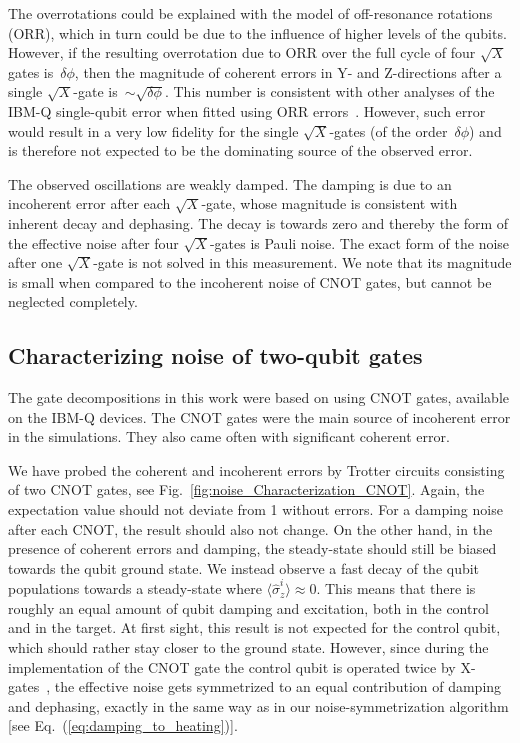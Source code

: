 \documentclass[twocolumn,amsmath,amssymb,pra]{revtex4-2}
\begin{document}
The overrotations could be explained with the model of off-resonance rotations~\cite{McKay_2017} (ORR),
which in turn could be due to the influence of higher levels of the qubits.
However, if the resulting overrotation due to ORR over the full cycle of four $\sqrt{X}$ gates is~$\delta\phi$,
then the magnitude of coherent errors in Y- and Z-directions after a single $\sqrt{X}$-gate is~$\sim \sqrt{\delta\phi}$.
This number is consistent with other analyses of the IBM-Q single-qubit error when fitted using ORR errors~\cite{Bultrini2021}.
However, such error would result in a very low fidelity for the single $\sqrt{X}$-gates (of the order~$\delta\phi$)
and is therefore not expected to be the dominating source of the observed error.

The observed oscillations are weakly damped.
The damping is due to an incoherent error after each $\sqrt{X}$-gate, whose magnitude is consistent with inherent decay and dephasing.
The decay is towards zero and thereby the form of the effective noise after four $\sqrt{X}$-gates
is Pauli noise.
The exact form of the noise after one $\sqrt{X}$-gate is not solved in this measurement.
We note that its magnitude is small when compared to the incoherent noise of CNOT gates, but cannot be neglected completely. 




\subsection{Characterizing noise of two-qubit gates}\label{sec:noise_CNOT}

The gate decompositions in this work were based on using CNOT gates, available on the IBM-Q devices.
The CNOT gates were the main source of incoherent error in the simulations.
They also came often with significant coherent error.

We have probed the coherent and incoherent errors by Trotter circuits consisting of two CNOT gates, see Fig.~\ref{fig:noise_Characterization_CNOT}.
Again, the expectation value should not deviate from 1 without errors.
For a damping noise after each CNOT, the result should also not change.
On the other hand, in the presence of coherent errors and damping,
the steady-state should still be biased towards the qubit ground state.
We instead observe a fast decay of the qubit populations towards a steady-state where $\langle\hat\sigma_z^i \rangle\approx 0$.
This means that there is roughly an equal amount of qubit damping and excitation, both in the control and in the target.
At first sight, this result is not expected for the control qubit, which should rather stay closer to the ground state.
However, since during the implementation of the CNOT gate the control qubit is operated twice by X-gates~\cite{Sheldon_2016},
the effective noise gets symmetrized to an equal contribution of damping and dephasing,
exactly in the same way as in our noise-symmetrization algorithm [see Eq.~(\ref{eq:damping_to_heating})].
\end{document}
